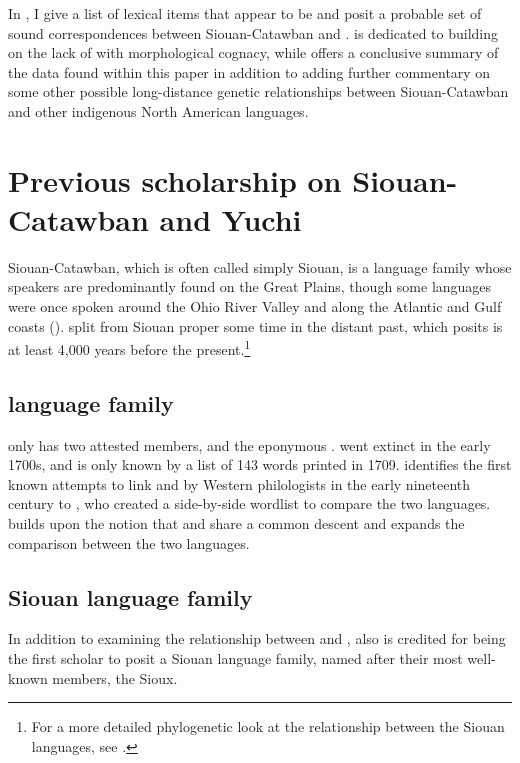 \documentclass[output=paper]{LSP/langsci}
\begin{document}
In , I give a list of lexical items that appear to be  and posit a probable set of sound correspondences between Siouan-Catawban and .  is dedicated to building on the lack of  with morphological cognacy, while  offers a conclusive summary of the data found within this paper in addition to adding further commentary on some other possible long-distance genetic relationships between Siouan-Catawban and other indigenous North American languages.

\section{Previous scholarship on Siouan-Catawban and Yuchi}\label{sec:kasak:2}

Siouan-Catawban, which is often called simply Siouan, is a language family whose speakers are predominantly found on the Great Plains, though some languages were once spoken around the Ohio River Valley and along the Atlantic and Gulf coasts (\citealt{Mithun1999}).  split from Siouan proper some time in the distant past, which \citet{Rankin1996} posits is at least 4,000 years before the present.\footnote{For a more detailed phylogenetic look at the relationship between the Siouan languages, see \citet{Rankin2010}.}

\subsection{ language family}

 only has two attested members,  and the eponymous .  went extinct in the early 1700s, and is only known by a list of 143 words printed in 1709. \citet{Carter1980} identifies the first known attempts to link  and  by Western philologists in the early nineteenth century to  \citet{AdelungVater1816}, who created a side-by-side wordlist to compare the two languages. \citet{Gallatin1836} builds upon the notion that  and  share a common descent and expands the comparison between the two languages.

\subsection{Siouan language family}

In addition to examining the relationship between  and , \citet{Gallatin1836} also is credited for being the first scholar to posit a Siouan language family, named after their most well-known members, the Sioux. 
\end{document}
